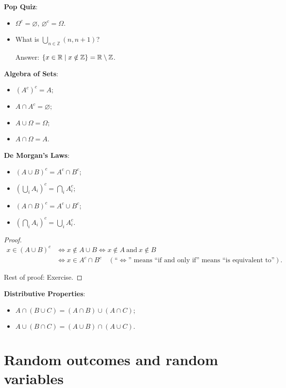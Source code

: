  \textbf{Pop Quiz}: 
  \begin{itemize}
  \item $\Omega^c = \varnothing$, $\varnothing^c = \Omega$.
  \item What is $\bigcup_{n\in \mathbb{Z}} (n,n+1)$?

  Answer: $\{x\in \mathbb{R}\mid x\notin \mathbb{Z}\} = \mathbb{R} \setminus \mathbb{Z}$.
  \end{itemize}

  \textbf{Algebra of Sets}:
  \begin{itemize}
  \item $(A^c)^c = A$;
  \item $A\cap A^c = \varnothing$;
  \item $A\cup \Omega = \Omega$;
  \item $A\cap \Omega = A$.
  \end{itemize}

  \textbf{De Morgan's Laws}:
  \begin{itemize}
  \item $(A\cup B)^c = A^c \cap B^c$;
  \item $\left( \bigcup_i A_i \right)^c = \bigcap_i A_i^c$;
  \item $(A\cap B)^c = A^c \cup B^c$;
  \item $\left( \bigcap_i A_i  \right)^c = \bigcup_i A_i^c$.
  \end{itemize}
  \begin{proof}
    \begin{align*}
      x\in (A\cup B)^c & \Leftrightarrow x\notin A\cup B \Leftrightarrow x\notin A~\text{and}~x\notin B\\
                       & \Leftrightarrow x\in A^c \cap B^c \quad (\text{``$\Leftrightarrow$'' means ``if and only if'' means ``is equivalent to''}).
    \end{align*}

    Rest of proof: Exercise.
  \end{proof}

  \textbf{Distributive Properties}:
  \begin{itemize}
  \item $A\cap (B\cup C) = (A\cap B) \cup (A\cap C)$;
  \item $A\cup (B\cap C) = (A\cup B)\cap (A\cup C)$.
  \end{itemize}
  

\section{Random outcomes and random variables }
\label{sec:rand-outc-rand}
